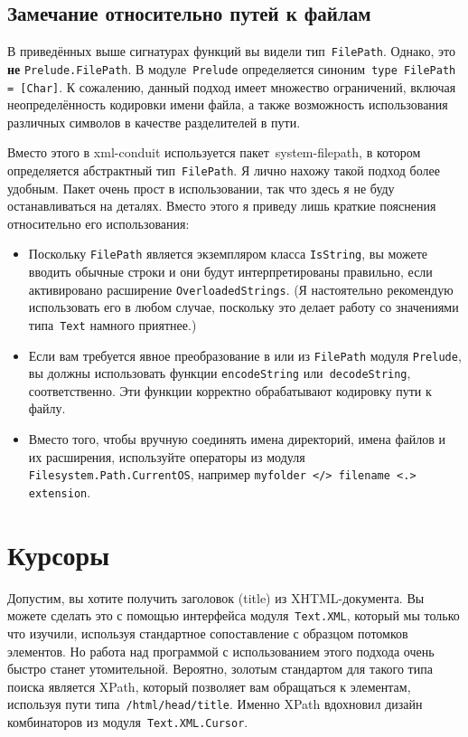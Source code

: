 \subsection{Замечание относительно путей к файлам}
В приведённых выше сигнатурах функций вы видели тип~\lstinline!FilePath!.
Однако, это \textbf{не} \lstinline!Prelude.FilePath!. В модуле~\lstinline!Prelude!
определяется синоним~\lstinline!type FilePath = [Char]!. К сожалению, данный
подход имеет множество ограничений, включая неопределённость кодировки имени
файла, а также возможность использования различных символов в качестве
разделителей в пути.

Вместо этого в xml-conduit используется пакет~system-filepath,
в котором определяется абстрактный тип~\lstinline!FilePath!. Я лично нахожу
такой подход более удобным. Пакет очень прост в использовании, так что здесь я
не буду останавливаться на деталях. Вместо этого я приведу лишь краткие
пояснения относительно его использования:
\begin{itemize}
    \item Поскольку \lstinline!FilePath! является экземпляром класса
        \lstinline!IsString!, вы можете вводить обычные строки и они будут
        интерпретированы правильно, если активировано расширение
        \lstinline!OverloadedStrings!. (Я настоятельно рекомендую использовать
        его в любом случае, поскольку это делает работу со значениями
        типа~\lstinline!Text! намного приятнее.)

    \item Если вам требуется явное преобразование в или из \lstinline!FilePath!
        модуля \lstinline!Prelude!, вы должны использовать функции
        \lstinline!encodeString! или~\lstinline!decodeString!,
        соответственно. Эти функции корректно обрабатывают кодировку пути к
        файлу.

    \item Вместо того, чтобы вручную соединять имена директорий, имена файлов и
        их расширения, используйте операторы из модуля
        \lstinline!Filesystem.Path.CurrentOS!, например
        \lstinline!myfolder </> filename <.> extension!.
\end{itemize}

\section{Курсоры}
Допустим, вы хотите получить заголовок (title) из XHTML-документа. Вы можете
сделать это с помощью интерфейса модуля~\lstinline!Text.XML!, который мы только
что изучили, используя стандартное сопоставление с образцом потомков элементов.
Но работа над программой с использованием этого подхода очень быстро станет
утомительной. Вероятно, золотым стандартом для такого типа поиска является
XPath, который позволяет вам обращаться к элементам, используя пути
типа~\lstinline!/html/head/title!. Именно XPath вдохновил дизайн комбинаторов
из модуля~\lstinline!Text.XML.Cursor!.


